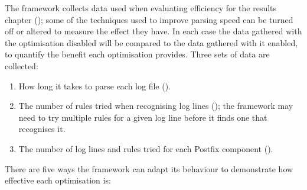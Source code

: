 The framework collects data used when evaluating \parsernames{} efficiency
for the results chapter (); some of the techniques used
to improve parsing speed can be turned off or altered to measure the effect
they have.  In each case the data gathered with the optimisation disabled
will be compared to the data gathered with it enabled, to quantify the
benefit each optimisation provides.  Three sets of data are collected:

\begin{enumerate}

    \item How long it takes to parse each log file ().

    \item The number of rules tried when recognising log lines
        (); the
        framework may need to try multiple rules for a given log line
        before it finds one that recognises it.

    \item The number of log lines and rules tried for each Postfix
        component ().

\end{enumerate}

There are five ways the framework can adapt its behaviour to demonstrate
how effective each optimisation is:

